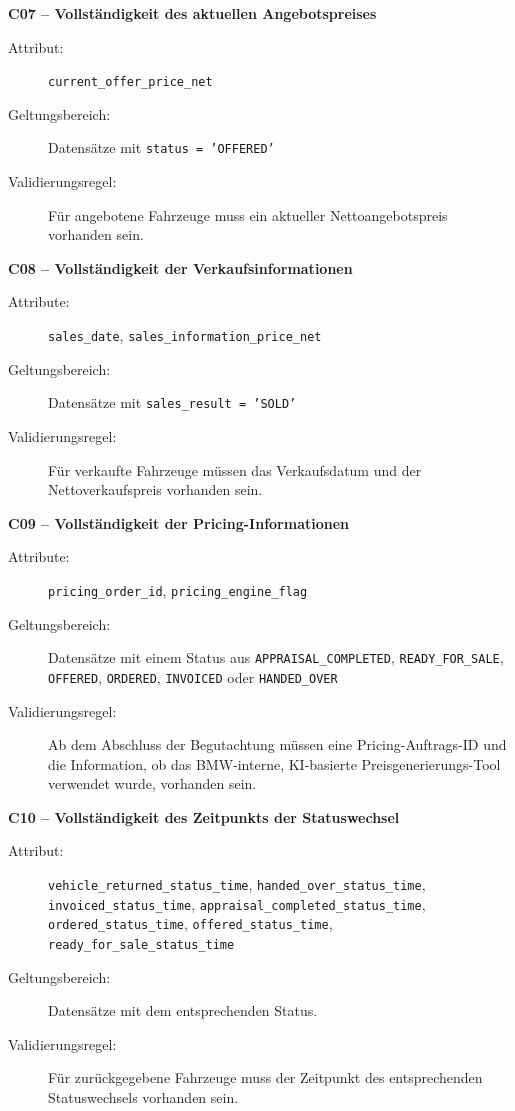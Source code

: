 \documentclass[../main.tex]{subfiles}
\begin{document}
\medskip 
\noindent\textbf{C07 -- Vollständigkeit des aktuellen Angebotspreises} 
\begin{description} 
    \item[Attribut:] \texttt{current\_offer\_price\_net} 
    \item[Geltungsbereich:] Datensätze mit \texttt{status = 'OFFERED'} 
    \item[Validierungsregel:] Für angebotene Fahrzeuge muss ein aktueller Nettoangebotspreis vorhanden sein. 
\end{description} 

\medskip \noindent\textbf{C08 -- Vollständigkeit der Verkaufsinformationen} 
\begin{description} 
    \item[Attribute:] \texttt{sales\_date}, \texttt{sales\_information\_price\_net} 
    \item[Geltungsbereich:] Datensätze mit \texttt{sales\_result = 'SOLD'} 
    \item[Validierungsregel:] Für verkaufte Fahrzeuge müssen das Verkaufsdatum und der Nettoverkaufspreis vorhanden sein. 
\end{description} 

\medskip 
\noindent\textbf{C09 -- Vollständigkeit der Pricing-Informationen} 
\begin{description} 
    \item[Attribute:] \texttt{pricing\_order\_id}, \texttt{pricing\_engine\_flag} 
    \item[Geltungsbereich:] Datensätze mit einem Status aus \texttt{APPRAISAL\_COMPLETED}, \texttt{READY\_FOR\_SALE}, \texttt{OFFERED}, \texttt{ORDERED}, \texttt{INVOICED} oder \texttt{HANDED\_OVER} 
    \item[Validierungsregel:] Ab dem Abschluss der Begutachtung müssen eine Pricing-Auftrags-ID und die Information, ob das BMW-interne, KI-basierte Preisgenerierungs-Tool verwendet wurde, vorhanden sein.
\end{description} 

\medskip 
\noindent\textbf{C10 -- Vollständigkeit des Zeitpunkts der Statuswechsel} 
\begin{description} 
    \item[Attribut:] \texttt{vehicle\_returned\_status\_time}, \texttt{handed\_over\_status\_time}, \texttt{invoiced\_status\_time}, \texttt{appraisal\_completed\_status\_time}, \texttt{ordered\_status\_time}, \texttt{offered\_status\_time}, \texttt{ready\_for\_sale\_status\_time}  
    \item[Geltungsbereich:] Datensätze mit dem entsprechenden Status. 
    \item[Validierungsregel:] Für zurückgegebene Fahrzeuge muss der Zeitpunkt des entsprechenden Statuswechsels vorhanden sein. 
\end{description} 
\end{document}
